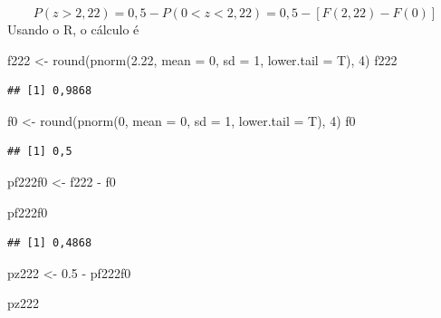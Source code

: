 \documentclass[
]{book}
\newenvironment{Shaded}{\begin{snugshade}}{\end{snugshade}}
\newcommand{\AttributeTok}[1]{\textcolor[rgb]{0.77,0.63,0.00}{#1}}
\newcommand{\DecValTok}[1]{\textcolor[rgb]{0.00,0.00,0.81}{#1}}
\newcommand{\FloatTok}[1]{\textcolor[rgb]{0.00,0.00,0.81}{#1}}
\newcommand{\FunctionTok}[1]{\textcolor[rgb]{0.00,0.00,0.00}{#1}}
\newcommand{\NormalTok}[1]{#1}
\newcommand{\OtherTok}[1]{\textcolor[rgb]{0.56,0.35,0.01}{#1}}
\newcommand{\SpecialCharTok}[1]{\textcolor[rgb]{0.00,0.00,0.00}{#1}}
\begin{document}
\[
  P(z>2,22) = 0,5 - P(0 < z < 2,22) = 0,5 - [F(2,22) - F(0)]
\]
Usando o R, o cálculo é

\begin{Shaded}
\begin{Highlighting}[]
\NormalTok{f222 }\OtherTok{\textless{}{-}} \FunctionTok{round}\NormalTok{(}\FunctionTok{pnorm}\NormalTok{(}\FloatTok{2.22}\NormalTok{, }\AttributeTok{mean =} \DecValTok{0}\NormalTok{, }\AttributeTok{sd =} \DecValTok{1}\NormalTok{, }\AttributeTok{lower.tail =}\NormalTok{ T), }
    \DecValTok{4}\NormalTok{)}
\NormalTok{f222}
\end{Highlighting}
\end{Shaded}

\begin{verbatim}
## [1] 0,9868
\end{verbatim}

\begin{Shaded}
\begin{Highlighting}[]
\NormalTok{f0 }\OtherTok{\textless{}{-}} \FunctionTok{round}\NormalTok{(}\FunctionTok{pnorm}\NormalTok{(}\DecValTok{0}\NormalTok{, }\AttributeTok{mean =} \DecValTok{0}\NormalTok{, }\AttributeTok{sd =} \DecValTok{1}\NormalTok{, }\AttributeTok{lower.tail =}\NormalTok{ T), }
    \DecValTok{4}\NormalTok{)}
\NormalTok{f0}
\end{Highlighting}
\end{Shaded}

\begin{verbatim}
## [1] 0,5
\end{verbatim}

\begin{Shaded}
\begin{Highlighting}[]
\NormalTok{pf222f0 }\OtherTok{\textless{}{-}}\NormalTok{ f222 }\SpecialCharTok{{-}}\NormalTok{ f0}

\NormalTok{pf222f0}
\end{Highlighting}
\end{Shaded}

\begin{verbatim}
## [1] 0,4868
\end{verbatim}

\begin{Shaded}
\begin{Highlighting}[]
\NormalTok{pz222 }\OtherTok{\textless{}{-}} \FloatTok{0.5} \SpecialCharTok{{-}}\NormalTok{ pf222f0}

\NormalTok{pz222}
\end{Highlighting}
\end{Shaded}
\end{document}
